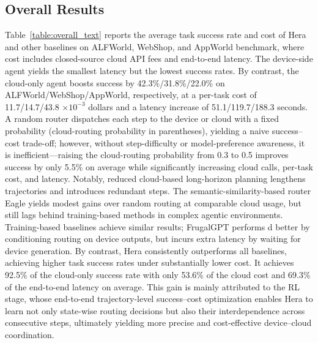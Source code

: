 \documentclass{article}
\newcommand{\name}{Hera\xspace}
\begin{document}
\subsection{Overall Results}
\label{subsec:main_results}
Table~\ref{table:overall_text} reports the average task success rate and cost of \name and other baselines on ALFWorld, WebShop, and AppWorld benchmark, where cost includes closed-source cloud API fees and end-to-end latency.
The device-side agent yields the smallest latency but the lowest success rates.
By contrast, the cloud-only agent boosts success by 42.3\%/31.8\%/22.0\% on ALFWorld/WebShop/AppWorld, respectively, at a per-task cost of 11.7/14.7/43.8 $\times 10^{-3}$ dollars and a latency increase of 51.1/119.7/188.3 seconds.
A random router dispatches each step to the device or cloud with a fixed probability (cloud-routing probability in parentheses), yielding a naive success--cost trade-off; however, without step-difficulty or model-preference awareness, it is inefficient—raising the cloud-routing probability from 0.3 to 0.5 improves success by only 5.5\% on average while significantly increasing cloud calls, per-task cost, and latency.
Notably, reduced cloud-based long-horizon planning lengthens trajectories and introduces redundant steps.
The semantic-similarity-based router Eagle yields modest gains over random routing at comparable cloud usage, but still lags behind training-based methods in complex agentic environments.
Training-based baselines achieve similar results; FrugalGPT performs d better by conditioning routing on device outputs, but incurs extra latency by waiting for device generation.
By contrast, \name consistently outperforms all baselines, achieving higher task success rates under substantially lower cost.
It achieves 92.5\% of the cloud-only success rate with only 53.6\% of the cloud cost and 69.3\% of the end-to-end latency on average.
This gain is mainly attributed to the RL stage, whose end-to-end trajectory-level success--cost optimization enables \name to learn not only state-wise routing decisions but also their interdependence across consecutive steps, ultimately yielding more precise and cost-effective device--cloud coordination.
\end{document}
